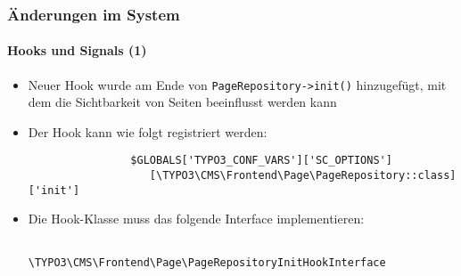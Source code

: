
\begin{frame}[fragile]
	\frametitle{Änderungen im System}
	\framesubtitle{Hooks und Signals (1)}

	\begin{itemize}

		\item Neuer Hook wurde am Ende von \texttt{PageRepository->init()} hinzugefügt,
			mit dem die Sichtbarkeit von Seiten beeinflusst werden kann

		\item Der Hook kann wie folgt registriert werden:
			\begin{lstlisting}
				$GLOBALS['TYPO3_CONF_VARS']['SC_OPTIONS']
				   [\TYPO3\CMS\Frontend\Page\PageRepository::class]['init']
			\end{lstlisting}

		\item Die Hook-Klasse muss das folgende Interface implementieren:
			\begin{lstlisting}
				\TYPO3\CMS\Frontend\Page\PageRepositoryInitHookInterface
			\end{lstlisting}

	\end{itemize}

\end{frame}


